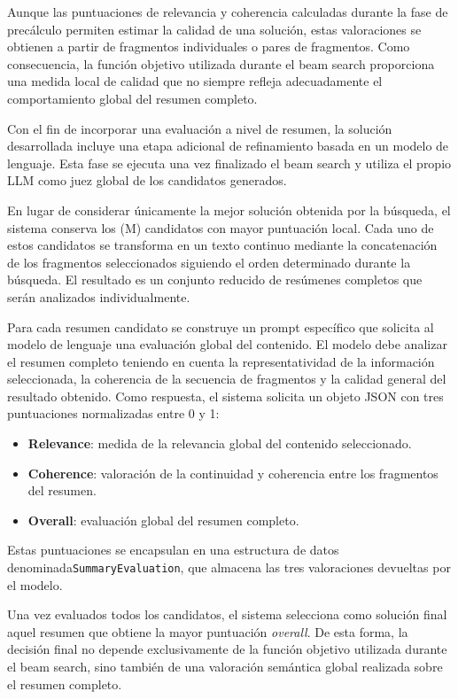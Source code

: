 \documentclass[12pt,a4paper]{article}
\begin{document}
Aunque las puntuaciones de relevancia y coherencia calculadas durante la fase de precálculo permiten estimar la calidad de una solución, estas valoraciones se obtienen a partir de fragmentos individuales o pares de fragmentos. Como consecuencia, la función objetivo utilizada durante el beam search proporciona una medida local de calidad que no siempre refleja adecuadamente el comportamiento global del resumen completo.

Con el fin de incorporar una evaluación a nivel de resumen, la solución desarrollada incluye una etapa adicional de refinamiento basada en un modelo de lenguaje. Esta fase se ejecuta una vez finalizado el beam search y utiliza el propio LLM como juez global de los candidatos generados.

En lugar de considerar únicamente la mejor solución obtenida por la búsqueda, el sistema conserva los (M) candidatos con mayor puntuación local. Cada uno de estos candidatos se transforma en un texto continuo mediante la concatenación de los fragmentos seleccionados siguiendo el orden determinado durante la búsqueda. El resultado es un conjunto reducido de resúmenes completos que serán analizados individualmente.

Para cada resumen candidato se construye un prompt específico que solicita al modelo de lenguaje una evaluación global del contenido. El modelo debe analizar el resumen completo teniendo en cuenta la representatividad de la información seleccionada, la coherencia de la secuencia de fragmentos y la calidad general del resultado obtenido. Como respuesta, el sistema solicita un objeto JSON con tres puntuaciones normalizadas entre 0 y 1:

\begin{itemize}
\item \textbf{Relevance}: medida de la relevancia global del contenido seleccionado.
\item \textbf{Coherence}: valoración de la continuidad y coherencia entre los fragmentos del resumen.
\item \textbf{Overall}: evaluación global del resumen completo.
\end{itemize}

Estas puntuaciones se encapsulan en una estructura de datos denominada\linebreak \texttt{SummaryEvaluation}, que almacena las tres valoraciones devueltas por el modelo.

Una vez evaluados todos los candidatos, el sistema selecciona como solución final aquel resumen que obtiene la mayor puntuación \textit{overall}. De esta forma, la decisión final no depende exclusivamente de la función objetivo utilizada durante el beam search, sino también de una valoración semántica global realizada sobre el resumen completo.
\end{document}
